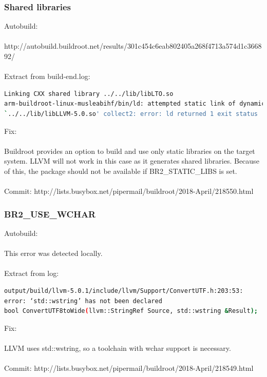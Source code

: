 \documentclass[12pt,a4paper,oneside]{article}
\begin{document}
\subsubsection*{Shared libraries}
Autobuild:\\\\
http://autobuild.buildroot.net/results/301c454c6eab802405a268f4713a574d1c366892/\\\\
Extract from build-end.log:
\begin{lstlisting}[language=sh,keywords={}]
Linking CXX shared library ../../lib/libLTO.so
arm-buildroot-linux-musleabihf/bin/ld: attempted static link of dynamic object
`../../lib/libLLVM-5.0.so' collect2: error: ld returned 1 exit status
\end{lstlisting}
Fix:\\\\
Buildroot provides an option to build and use only static libraries on the target
system. LLVM will not work in this case as it generates shared libraries. Because
of this, the package should not be available if BR2\_STATIC\_LIBS is set.\\\\
Commit: http://lists.busybox.net/pipermail/buildroot/2018-April/218550.html

\subsubsection*{BR2\_USE\_WCHAR}
Autobuild:\\\\
This error was detected locally.\\\\
Extract from log:
\begin{lstlisting}[language=sh]
output/build/llvm-5.0.1/include/llvm/Support/ConvertUTF.h:203:53:
error: ‘std::wstring’ has not been declared
bool ConvertUTF8toWide(llvm::StringRef Source, std::wstring &Result);
\end{lstlisting}
Fix:\\\\
LLVM uses std::wstring, so a toolchain with wchar support is necessary.\\\\
Commit: http://lists.busybox.net/pipermail/buildroot/2018-April/218549.html
\end{document}
